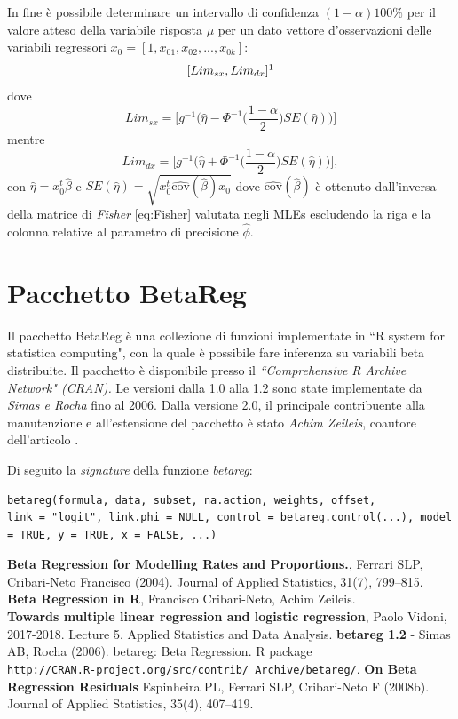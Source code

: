 \documentclass[twoside,twocolumn]{article}
\begin{document}
In fine è possibile determinare un intervallo di confidenza $(1-\alpha)100\%$ per il valore atteso della variabile risposta $\mu$ per un dato vettore d'osservazioni delle variabili regressori $x_0=[1,x_{01},x_{02},...,x_{0k}]$:
$$[Lim_{sx}, Lim_{dx}]\footnote{Tale intervallo è valido solo per funzioni di collegamento $g(\cdot)$ strettamente crescenti.}$$ dove 
$$Lim_{sx}=\bigg[ g^{-1}\bigg(\hat{\eta} -\Phi^{-1}\Big(\frac{1-\alpha}{2}\Big)SE(\hat{\eta})\bigg)  \bigg]  $$
mentre
$$ Lim_{dx}=\bigg[ g^{-1}\bigg(\hat{\eta} +\Phi^{-1}\Big(\frac{1-\alpha}{2}\Big)SE(\hat{\eta})\bigg)  \bigg], $$
con $\hat{\eta}=x_0^t \hat{\beta}$ e $SE(\hat{\eta})=\sqrt{x_0^t \widehat{\text{cov}}(\hat{\beta})x_0}$ dove $\widehat{\text{cov}}(\hat{\beta})$ è ottenuto dall'inversa della matrice di \emph{Fisher} \eqref{eq:Fisher} valutata negli MLEs escludendo la riga e la colonna relative al parametro di precisione $\hat{\phi}$.

\section{Pacchetto BetaReg}
Il pacchetto BetaReg è una collezione di funzioni implementate in ``R system for statistica computing",  con la quale è possibile fare inferenza su variabili beta distribuite. Il pacchetto è disponibile presso il \emph{``Comprehensive R Archive Network" (CRAN).} Le versioni dalla 1.0 alla 1.2 sono state implementate da \emph{Simas e Rocha} fino al 2006. Dalla versione 2.0, il principale contribuente alla manutenzione e all'estensione del pacchetto è stato \emph{Achim Zeileis}, coautore dell'articolo \cite{BReg2006}.

Di seguito la \emph{signature} della funzione \emph{betareg}:
\begin{lstlisting}[caption={Signature della funzione betareg},columns=full]
betareg(formula, data, subset, na.action, weights, offset,
link = "logit", link.phi = NULL, control = betareg.control(...), model = TRUE, y = TRUE, x = FALSE, ...)
\end{lstlisting}

\newpage
\tableofcontents
		\begin{thebibliography}{99} 
	 \textbf{Beta Regression for Modelling Rates and Proportions.}, Ferrari SLP, Cribari-Neto Francisco (2004).  Journal of Applied Statistics, 31(7), 799–815.
	 \textbf{Beta Regression in R}, Francisco Cribari-Neto, Achim Zeileis.\\
	 \textbf{Towards multiple linear regression and logistic regression}, Paolo Vidoni, 2017-2018. Lecture 5. Applied Statistics and Data Analysis.
	\textbf{betareg 1.2} - Simas AB, Rocha (2006). betareg: Beta Regression. R package \\ \texttt{http://CRAN.R-project.org/src/contrib/ Archive/betareg/}.
	\textbf{On Beta Regression Residuals} Espinheira PL, Ferrari SLP, Cribari-Neto F (2008b). Journal
of Applied Statistics, 35(4), 407–419.
	\end{thebibliography}
\end{document}
